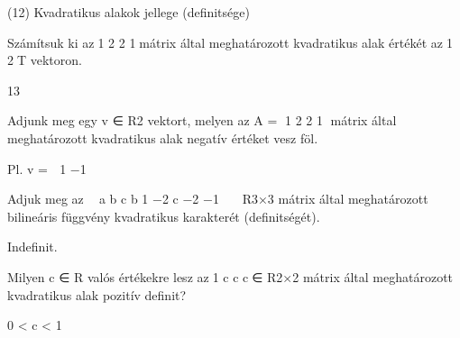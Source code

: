 \begin{frame}[plain]
\begin{tcolorbox}[center, colback={myyellow}, coltext={black}, colframe={myyellow}]
    {\RHuge  (12) Kvadratikus alakok jellege (deﬁnitsége)}
    \mmedskip
\end{tcolorbox}
\end{frame}

\begin{frame}
  \begin{tcolorbox}[title={12/1. -N-}]
     Számítsuk ki az1 2 2 1mátrix által meghatározott kvadratikus alak értékét az1 2T vektoron.

  \tcblower

    \mmedskip 
    
    13
  \end{tcolorbox}
\end{frame}


\begin{frame}
  \begin{tcolorbox}[title={12/2. -R-}]
     Adjunk meg egy v ∈ R2 vektort, melyen az A = 1 2 2 1 mátrix által meghatározott kvadratikus alak negatív értéket vesz föl.


  \tcblower

    \mmedskip 
    
    Pl. v =  1 −1
  \end{tcolorbox}
\end{frame}


\begin{frame}
  \begin{tcolorbox}[title={12/3. -R-}]
     Adjuk meg az 
a b c b 1 −2 c −2 −1
 ∈ R3×3 mátrix által meghatározott bilineáris függvény kvadratikus karakterét (deﬁnitségét).


  \tcblower

    \mmedskip 
    
    Indeﬁnit.
  \end{tcolorbox}
\end{frame}


\begin{frame}
  \begin{tcolorbox}[title={12/4. -N-}]
     Milyen c ∈ R valós értékekre lesz az1 c c c∈ R2×2 mátrix által meghatározott kvadratikus alak pozitív deﬁnit?

  \tcblower

    \mmedskip 
    
    0 < c < 1
  \end{tcolorbox}
\end{frame}


